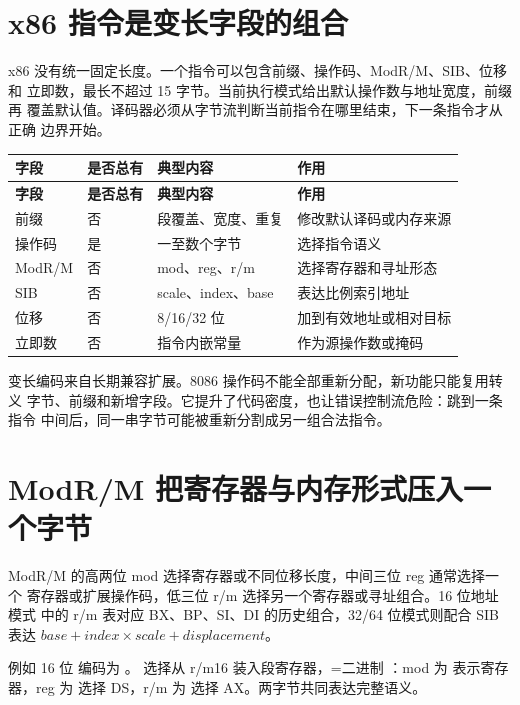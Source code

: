 \section{x86 指令是变长字段的组合}

x86 没有统一固定长度。一个指令可以包含前缀、操作码、ModR/M、SIB、位移和
立即数，最长不超过 15 字节。当前执行模式给出默认操作数与地址宽度，前缀再
覆盖默认值。译码器必须从字节流判断当前指令在哪里结束，下一条指令才从正确
边界开始。

\begin{longtable}{L{0.15\textwidth}L{0.17\textwidth}L{0.23\textwidth}L{0.33\textwidth}}
\toprule
\textbf{字段} & \textbf{是否总有} & \textbf{典型内容} & \textbf{作用}\\
\midrule
\endfirsthead
\toprule
\textbf{字段} & \textbf{是否总有} & \textbf{典型内容} & \textbf{作用}\\
\midrule
\endhead
前缀 & 否 & 段覆盖、宽度、重复 & 修改默认译码或内存来源\\
操作码 & 是 & 一至数个字节 & 选择指令语义\\
ModR/M & 否 & mod、reg、r/m & 选择寄存器和寻址形态\\
SIB & 否 & scale、index、base & 表达比例索引地址\\
位移 & 否 & 8/16/32 位 & 加到有效地址或相对目标\\
立即数 & 否 & 指令内嵌常量 & 作为源操作数或掩码\\
\bottomrule
\end{longtable}

变长编码来自长期兼容扩展。8086 操作码不能全部重新分配，新功能只能复用转义
字节、前缀和新增字段。它提升了代码密度，也让错误控制流危险：跳到一条指令
中间后，同一串字节可能被重新分割成另一组合法指令。

\section{ModR/M 把寄存器与内存形式压入一个字节}

ModR/M 的高两位 mod 选择寄存器或不同位移长度，中间三位 reg 通常选择一个
寄存器或扩展操作码，低三位 r/m 选择另一个寄存器或寻址组合。16 位地址模式
中的 r/m 表对应 BX、BP、SI、DI 的历史组合，32/64 位模式则配合 SIB 表达
\(base+index\times scale+displacement\)。

例如 16 位  编码为 。 选择从
r/m16 装入段寄存器，=二进制 ：mod 为
 表示寄存器，reg 为  选择 DS，r/m 为
 选择 AX。两字节共同表达完整语义。

